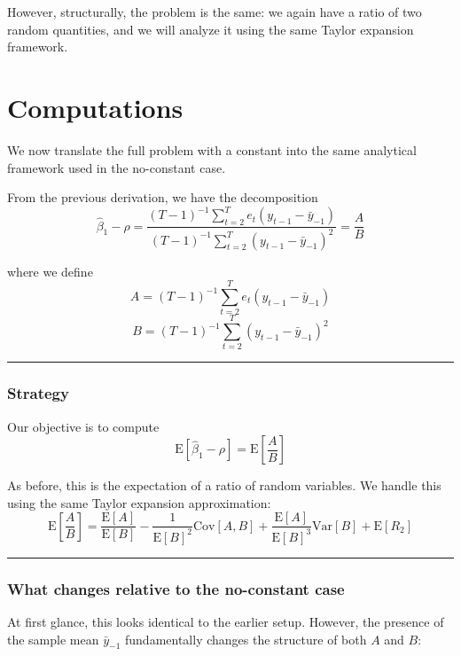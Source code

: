 \documentclass[11pt]{article}
\begin{document}
However, structurally, the problem is the same: we again have a ratio of
two random quantities, and we will analyze it using the same Taylor
expansion framework.

    \section{Computations}\label{computations}

We now translate the full problem with a constant into the same
analytical framework used in the no-constant case.

From the previous derivation, we have the decomposition \[
\hat\beta_{1}-\rho
= \frac{(T-1)^{-1}\sum_{t=2}^{T} e_t(y_{t-1}-\bar y_{-1})}
{(T-1)^{-1}\sum_{t=2}^{T} (y_{t-1}-\bar y_{-1})^2}
= \frac{A}{B}
\]

where we define \[
A = (T-1)^{-1}\sum_{t=2}^{T} e_t(y_{t-1}-\bar y_{-1})
\] \[
B = (T-1)^{-1}\sum_{t=2}^{T} (y_{t-1}-\bar y_{-1})^2
\]

\begin{center}\rule{0.5\linewidth}{0.5pt}\end{center}

\subsubsection{Strategy}\label{strategy}

Our objective is to compute \[
\text{E}[\hat\beta_1 - \rho] = \text{E}\left[\frac{A}{B}\right]
\]

As before, this is the expectation of a ratio of random variables. We
handle this using the same Taylor expansion approximation: \[
\text{E}\left[\frac{A}{B}\right]
=\frac{\text{E}[A]}{\text{E}[B]}
-\frac{1}{\text{E}[B]^2}\text{Cov}\left[A,B\right]
+\frac{\text{E}[A]}{\text{E}[B]^3}\text{Var}\left[B\right]
+\text{E}\left[R_2\right]
\]

\begin{center}\rule{0.5\linewidth}{0.5pt}\end{center}

\subsubsection{What changes relative to the no-constant
case}\label{what-changes-relative-to-the-no-constant-case}

At first glance, this looks identical to the earlier setup. However, the
presence of the sample mean \(\bar y_{-1}\) fundamentally changes the
structure of both \(A\) and \(B\):
\end{document}
